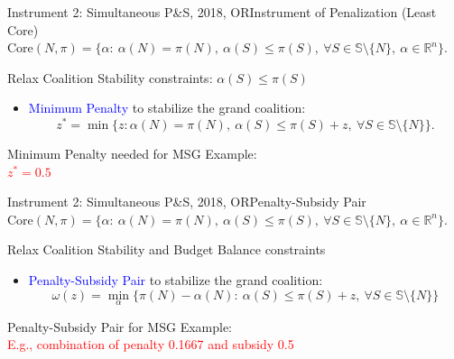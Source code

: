 \documentclass[14pt]{beamer}
\newcommand{\R}{\mathbb{R}}
\begin{document}
\begin{frame}{Instrument 2: Simultaneous P\&S, {\footnotesize 2018, OR}}{Instrument of Penalization (Least Core)}
\vspace{3mm}
{\footnotesize $\mathrm{Core}(N,\pi) = \bigg\{ \alpha:~ \alpha(N)=\pi(N), ~\alpha(S) \leq \pi(S), ~\forall S \in \mathbb{S} \setminus \{N\},~\alpha \in \R^n   \bigg\}$.}
\begin{shaded}
\centering Relax Coalition Stability constraints: $\alpha(S) \leq \pi(S)$
\end{shaded}
\begin{itemize}
\item \textcolor{blue}{Minimum Penalty} to stabilize the grand coalition:
\small
\begin{equation*}
z^* = \min \big\{ z:\alpha(N)= \pi(N),~\alpha(S) \leq \pi(S)+z, ~\forall S \in \mathbb{S} \setminus \{N\} \big\}.
\end{equation*}
\end{itemize}
\pause
\vspace{-7mm}
\begin{shaded}
\centering
\small
Minimum Penalty needed for MSG Example:\\
\vspace{2mm}
\textcolor{red}{$z^* = 0.5$}
\end{shaded}
\end{frame}



\begin{frame}{Instrument 2: Simultaneous P\&S, {\footnotesize 2018, OR}}{Penalty-Subsidy Pair}
\vspace{3mm}
{\footnotesize $\mathrm{Core}(N,\pi) = \bigg\{ \alpha:~ \alpha(N)=\pi(N), ~\alpha(S) \leq \pi(S), ~\forall S \in \mathbb{S} \setminus \{N\},~\alpha \in \R^n   \bigg\}$.}
\begin{shaded}
\centering Relax Coalition Stability and Budget Balance constraints
\end{shaded}
\begin{itemize}
\item \textcolor{blue}{Penalty-Subsidy Pair} to stabilize the grand coalition:
\small
\begin{equation*}
\omega(z) = \min_{\alpha} \bigg\{ \pi(N) - \alpha(N):~\alpha(S) \leq \pi(S)+z,~\forall S \in \mathbb{S} \setminus \{N\} \bigg\}
\end{equation*}
\end{itemize}
\pause
\vspace{-7mm}
\begin{shaded}
\centering
\small
Penalty-Subsidy Pair for MSG Example:\\
\vspace{2mm}
\textcolor{red}{E.g., combination of penalty 0.1667 and subsidy 0.5}
\end{shaded}
\end{frame}
\end{document}
